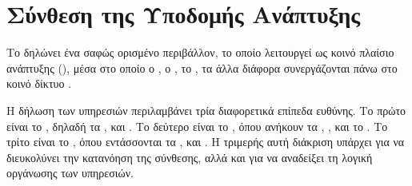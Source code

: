 \section{Σύνθεση της Υποδομής Ανάπτυξης}
\label{sec:appendix_compose_stack}

Το \texttt{} δηλώνει ένα σαφώς ορισμένο  περιβάλλον,
το οποίο λειτουργεί ως κοινό πλαίσιο ανάπτυξης (),
μέσα στο οποίο ο , ο , το , τα άλλα διάφορα  
συνεργάζονται πάνω στο κοινό δίκτυο \texttt{}.

Η δήλωση των υπηρεσιών περιλαμβάνει τρία διαφορετικά επίπεδα ευθύνης. Το πρώτο είναι το ,
δηλαδή τα \texttt{}, \texttt{} και \texttt{}. Το δεύτερο είναι το ,
όπου ανήκουν τα \texttt{}, \texttt{}, \texttt{} και το \texttt{}.
Το τρίτο είναι το , όπου εντάσσονται τα \texttt{}, \texttt{} 
και \texttt{}. Η τριμερής αυτή διάκριση υπάρχει για να διευκολύνει την κατανόηση της σύνθεσης,
αλλά και για να αναδείξει τη λογική οργάνωσης των υπηρεσιών.




\begin{table}[H]
\centering
\caption{Κύριες υπηρεσίες της σύνθεσης,  και λειτουργικός ρόλος}
\label{tab:appendix_service_port_store_matrix}

\end{table}

